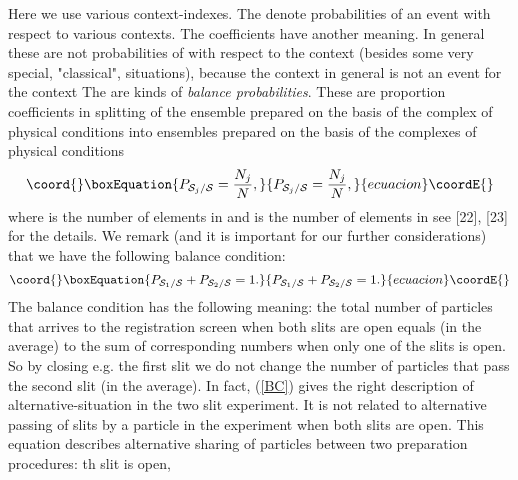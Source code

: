 \documentclass[12pt,oneside,final,a4paper]{article}
\begin{document}
Here we use various context-indexes. The \coordHE{} denote probabilities
of an event \coordHE{} with respect to various contexts. The coefficients 
\coordHE{} have another
meaning. In general these
are not probabilities of \coordHE{} with respect to the context \coordHE{}
(besides some very special, "classical", situations), because the context
\coordHE{} in general is not an event for the context \coordHE{}
The \coordHE{}
are kinds of {\it balance probabilities}. These are proportion coefficients in splitting
of the ensemble \coordHE{} prepared on the basis of the complex of physical conditions \coordHE{}
into ensembles \coordHE{} prepared on the basis of the complexes of physical conditions \coordHE{}
\begin{equation}\coord{}\boxEquation{
\label{BP}
P_{{\cal S}_j/{\cal S}}= \frac{N_j}{N},
}{
P_{{\cal S}_j/{\cal S}}= \frac{N_j}{N},
}{ecuacion}\coordE{}\end{equation}
where \coordHE{} is the number of elements in \coordHE{} and \coordHE{} 
is the number of elements in \coordHE{} see [22], [23] for the details.
We remark (and it is important for our
further considerations) that we have the following balance condition:
\begin{equation}\coord{}\boxEquation{
\label{BC}
P_{{\cal S}_1/{\cal S}} + P_{{\cal S}_2/{\cal S}} =1.
}{
P_{{\cal S}_1/{\cal S}} + P_{{\cal S}_2/{\cal S}} =1.
}{ecuacion}\coordE{}\end{equation}
The balance condition has the following meaning: the total number of particles that
arrives to the registration screen when both slits are open equals (in the average)
to the sum of corresponding numbers when only one of the slits is open. So by closing e.g. the first
slit we do not change the number of particles that pass the second slit (in the average).
In fact, (\ref{BC}) gives the right description of alternative-situation in the two slit
experiment. It is not related to alternative passing of slits by a particle in the experiment
when both slits are open. This equation describes alternative sharing of particles between
two preparation procedures: \coordHE{}th slit is open, \coordHE{}
\end{document}
